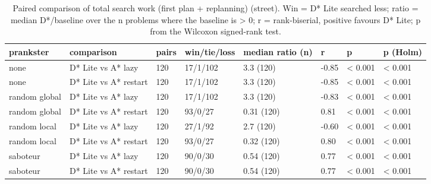 \begin{table}[t]
\centering
\small
\caption{Paired comparison of total search work (first plan + replanning) (street). Win = D* Lite searched less; ratio = median D*/baseline over the n problems where the baseline is > 0; r = rank-biserial, positive favours D* Lite; p from the Wilcoxon signed-rank test.}
\label{tab:tests-total-street}
\begin{tabular}{llllllll}
\toprule
prankster & comparison & pairs & win/tie/loss & median ratio (n) & r & p & p (Holm) \\
\midrule
none & D* Lite vs A* lazy & 120 & 17/1/102 & 3.3 (120) & -0.85 & < 0.001 & < 0.001 \\
none & D* Lite vs A* restart & 120 & 17/1/102 & 3.3 (120) & -0.85 & < 0.001 & < 0.001 \\
random global & D* Lite vs A* lazy & 120 & 17/1/102 & 3.3 (120) & -0.83 & < 0.001 & < 0.001 \\
random global & D* Lite vs A* restart & 120 & 93/0/27 & 0.31 (120) & 0.81 & < 0.001 & < 0.001 \\
random local & D* Lite vs A* lazy & 120 & 27/1/92 & 2.7 (120) & -0.60 & < 0.001 & < 0.001 \\
random local & D* Lite vs A* restart & 120 & 93/0/27 & 0.32 (120) & 0.80 & < 0.001 & < 0.001 \\
saboteur & D* Lite vs A* lazy & 120 & 90/0/30 & 0.54 (120) & 0.77 & < 0.001 & < 0.001 \\
saboteur & D* Lite vs A* restart & 120 & 90/0/30 & 0.54 (120) & 0.77 & < 0.001 & < 0.001 \\
\bottomrule
\end{tabular}
\end{table}
